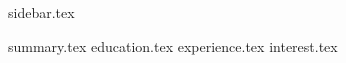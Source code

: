 \documentclass[espanol]{cv-style}
\newcommand*{\sectiondir}{contents/}
\begin{document}
\lastupdated
\begin{sidebar}
{sidebar.tex}
\end{sidebar}
\hfill
\begin{mainframe}
{summary.tex}
{education.tex}
{experience.tex}
{interest.tex}
\end{mainframe}
\end{document}
